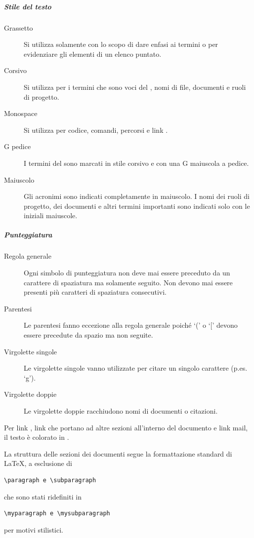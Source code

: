 \documentclass[a4paper, titlepage]{article}
\begin{document}
\subparagraph{Stile del testo}
\begin{description}
	\item[Grassetto] 
	Si utilizza solamente con lo scopo di dare enfasi ai termini o per evidenziare gli elementi di un elenco puntato.
	\item[Corsivo] 
	Si utilizza per i termini che sono voci del , nomi di file, documenti e ruoli di progetto.
	\item[Monospace] 
	 Si utilizza per codice, comandi, percorsi e link .
	 \item[G pedice]
	 I termini del  sono marcati in stile corsivo e con una G maiuscola a pedice.
	 \item[Maiuscolo]
	 Gli acronimi sono indicati completamente in maiuscolo. I nomi dei ruoli di progetto, dei documenti e altri termini importanti sono indicati solo con le iniziali maiuscole.
\end{description}

\subparagraph{Punteggiatura}
\begin{description}
	\item[Regola generale] 
	Ogni simbolo di punteggiatura non deve mai essere preceduto da un carattere di spaziatura ma solamente seguito. Non devono mai essere presenti più caratteri di spaziatura consecutivi.
	\item[Parentesi] 
	Le parentesi fanno eccezione alla regola generale poiché `(' o `[' devono essere precedute da spazio ma non seguite.
	\item[Virgolette singole] 
	Le virgolette singole vanno utilizzate per citare un singolo carattere (p.es. `g').
	\item[Virgolette doppie] 
	Le virgolette doppie racchiudono nomi di documenti o citazioni.
\end{description}

Per link , link che portano ad altre sezioni all'interno del documento e link mail, il testo è colorato in \crule[blue].

La struttura delle sezioni dei documenti segue la formattazione standard di \LaTeX , a esclusione di \begin{verbatim}\paragraph e \subparagraph\end{verbatim} che sono stati ridefiniti in \begin{verbatim}\myparagraph e \mysubparagraph\end{verbatim} per motivi stilistici.
\end{document}
